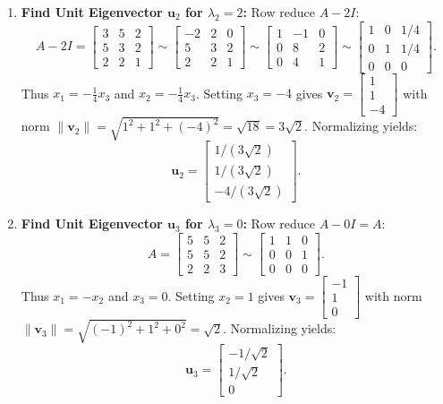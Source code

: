 \documentclass[11pt, letterpaper]{article}
\theoremstyle{definition}
\theoremstyle{remark}
\begin{document}
\begin{enumerate}[label=\textbf{Step \arabic*:}]
    \[
    \mathbf{u}_1 = \begin{bmatrix} 2/3 \\ 2/3 \\ 1/3 \end{bmatrix}.
    \]
    \item \textbf{Find Unit Eigenvector $\mathbf{u}_2$ for $\lambda_2 = 2$:}
    Row reduce $A - 2I$:
    \[
    A - 2I = \begin{bmatrix} 3 & 5 & 2 \\ 5 & 3 & 2 \\ 2 & 2 & 1 \end{bmatrix} \sim \begin{bmatrix} -2 & 2 & 0 \\ 5 & 3 & 2 \\ 2 & 2 & 1 \end{bmatrix} \sim \begin{bmatrix} 1 & -1 & 0 \\ 0 & 8 & 2 \\ 0 & 4 & 1 \end{bmatrix} \sim \begin{bmatrix} 1 & 0 & 1/4 \\ 0 & 1 & 1/4 \\ 0 & 0 & 0 \end{bmatrix}.
    \]
    Thus $x_1 = -\frac{1}{4}x_3$ and $x_2 = -\frac{1}{4}x_3$. Setting $x_3 = -4$ gives $\mathbf{v}_2 = \begin{bmatrix} 1 \\ 1 \\ -4 \end{bmatrix}$ with norm $\|\mathbf{v}_2\| = \sqrt{1^2 + 1^2 + (-4)^2} = \sqrt{18} = 3\sqrt{2}$. Normalizing yields:
    \[
    \mathbf{u}_2 = \begin{bmatrix} 1/(3\sqrt{2}) \\ 1/(3\sqrt{2}) \\ -4/(3\sqrt{2}) \end{bmatrix}.
    \]
    \item \textbf{Find Unit Eigenvector $\mathbf{u}_3$ for $\lambda_3 = 0$:}
    Row reduce $A - 0I = A$:
    \[
    A = \begin{bmatrix} 5 & 5 & 2 \\ 5 & 5 & 2 \\ 2 & 2 & 3 \end{bmatrix} \sim \begin{bmatrix} 1 & 1 & 0 \\ 0 & 0 & 1 \\ 0 & 0 & 0 \end{bmatrix}.
    \]
    Thus $x_1 = -x_2$ and $x_3 = 0$. Setting $x_2 = 1$ gives $\mathbf{v}_3 = \begin{bmatrix} -1 \\ 1 \\ 0 \end{bmatrix}$ with norm $\|\mathbf{v}_3\| = \sqrt{(-1)^2 + 1^2 + 0^2} = \sqrt{2}$. Normalizing yields:
    \[
    \mathbf{u}_3 = \begin{bmatrix} -1/\sqrt{2} \\ 1/\sqrt{2} \\ 0 \end{bmatrix}.
    \]
\end{enumerate}
\end{document}
